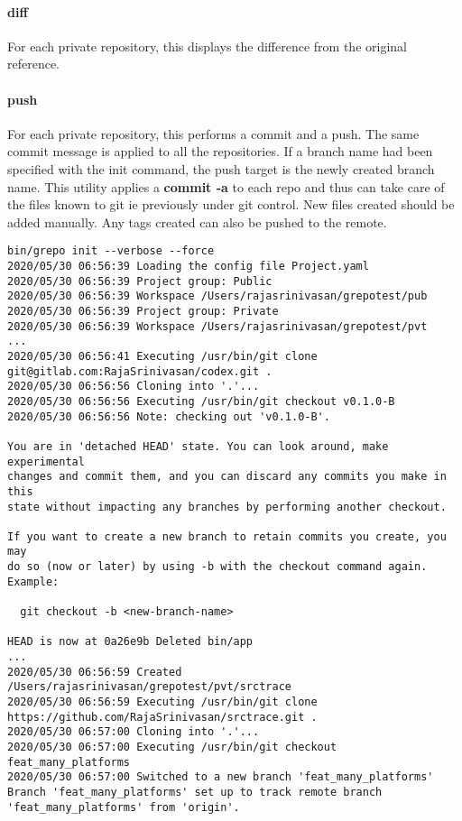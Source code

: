 \documentclass[11pt, a4paper]{article} %
\begin{document}
\paragraph{diff} For each private repository, this displays the difference from the original reference. 

\paragraph{push} For each private repository, this performs a commit and a push. The same commit message is applied to all the repositories.  If a branch name had been specified with the init command, the push target is the newly created branch name. This utility applies a \textbf{commit -a} to each repo and thus can take care of the files known to git ie previously under git control. New files created should be added manually. Any tags created can also be pushed to the remote.

\begin{lstlisting}[caption=Project Initialization. Sample log]
bin/grepo init --verbose --force
2020/05/30 06:56:39 Loading the config file Project.yaml
2020/05/30 06:56:39 Project group: Public
2020/05/30 06:56:39 Workspace /Users/rajasrinivasan/grepotest/pub
2020/05/30 06:56:39 Project group: Private
2020/05/30 06:56:39 Workspace /Users/rajasrinivasan/grepotest/pvt
...
2020/05/30 06:56:41 Executing /usr/bin/git clone git@gitlab.com:RajaSrinivasan/codex.git .
2020/05/30 06:56:56 Cloning into '.'...
2020/05/30 06:56:56 Executing /usr/bin/git checkout v0.1.0-B
2020/05/30 06:56:56 Note: checking out 'v0.1.0-B'.

You are in 'detached HEAD' state. You can look around, make experimental
changes and commit them, and you can discard any commits you make in this
state without impacting any branches by performing another checkout.

If you want to create a new branch to retain commits you create, you may
do so (now or later) by using -b with the checkout command again. Example:

  git checkout -b <new-branch-name>

HEAD is now at 0a26e9b Deleted bin/app
...
2020/05/30 06:56:59 Created /Users/rajasrinivasan/grepotest/pvt/srctrace
2020/05/30 06:56:59 Executing /usr/bin/git clone https://github.com/RajaSrinivasan/srctrace.git .
2020/05/30 06:57:00 Cloning into '.'...
2020/05/30 06:57:00 Executing /usr/bin/git checkout feat_many_platforms
2020/05/30 06:57:00 Switched to a new branch 'feat_many_platforms'
Branch 'feat_many_platforms' set up to track remote branch 'feat_many_platforms' from 'origin'.
\end{lstlisting}
\end{document}
